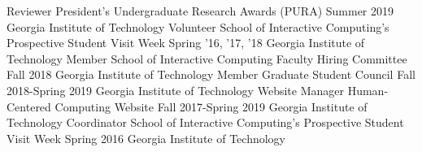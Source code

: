 {\color{black}\fontsize{12pt}{1em}} 

\begin{cventries}
\cventry
    {Reviewer}
    {President's Undergraduate Research Awards (PURA)}
    {Summer 2019}
    {Georgia Institute of Technology}
    {}    
\cventry
    {Volunteer}
    {School of Interactive Computing’s Prospective Student Visit Week}
    {Spring '16, '17, '18}
    {Georgia Institute of Technology}
    {}
\cventry
    {Member}
    {School of Interactive Computing Faculty Hiring Committee}
    {Fall 2018}
    {Georgia Institute of Technology}
    {}
\cventry
    {Member}
    {Graduate Student Council}
    {Fall 2018-Spring 2019}
    {Georgia Institute of Technology}
    {}    
\cventry
    {Website Manager}
    {Human-Centered Computing Website}
    {Fall 2017-Spring 2019}
    {Georgia Institute of Technology}
    {}    
\cventry
    {Coordinator}
    {School of Interactive Computing's Prospective Student Visit Week}
    {Spring 2016}
    {Georgia Institute of Technology}
    {}
\end{cventries}


